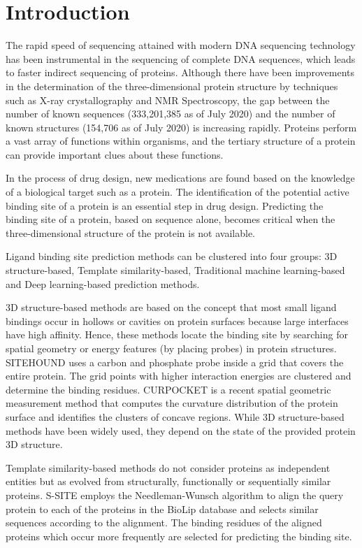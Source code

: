 \documentclass[journal=jacsat,manuscript=article]{achemso}
\begin{document}
\section{Introduction}
\quad The rapid speed of sequencing attained with modern DNA sequencing technology has been instrumental in the sequencing of complete DNA sequences, which leads to faster indirect sequencing of proteins. Although there have been improvements in the determination of the three-dimensional protein structure by techniques such as X-ray crystallography and NMR Spectroscopy, the gap between the number of known sequences (333,201,385 as of July 2020) and the number of known structures (154,706 as of July 2020) is increasing rapidly. Proteins perform a vast array of functions within organisms, and the tertiary structure of a protein can provide important clues about these functions.

In the process of drug design, new medications are found based on the knowledge of a biological target such as a protein. The identification of the potential active binding site of a protein is an essential step in drug design. Predicting the binding site of a protein, based on sequence alone, becomes critical when the three-dimensional structure of the protein is not available.

Ligand binding site prediction methods can be clustered into four groups: 3D structure-based, Template similarity-based, Traditional machine learning-based and Deep learning-based prediction methods.

3D structure-based methods are based on the concept that most small ligand bindings occur in hollows or cavities on protein surfaces because large interfaces have high affinity. Hence, these methods locate the binding site by searching for spatial geometry or energy features (by placing probes) in protein structures. SITEHOUND \cite{hernandez2009sitehound} uses a carbon and phosphate probe inside a grid that covers the entire protein. The grid points with higher interaction energies are clustered and determine the binding residues. CURPOCKET \cite{liu2020cb} is a recent spatial geometric measurement method that computes the curvature distribution of the protein surface and identifies the clusters of concave regions. While 3D structure-based methods have been widely used, they depend on the state of the provided protein 3D structure.

\newpage
Template similarity-based methods do not consider proteins as independent entities but as evolved from structurally, functionally or sequentially similar proteins. S-SITE \cite{yang2013protein} employs the Needleman-Wunsch algorithm to align the query protein to each of the proteins in the BioLip \cite{yang2012biolip} database and selects similar sequences according to the alignment. The binding residues of the aligned proteins which occur more frequently are selected for predicting the binding site.
\end{document}
